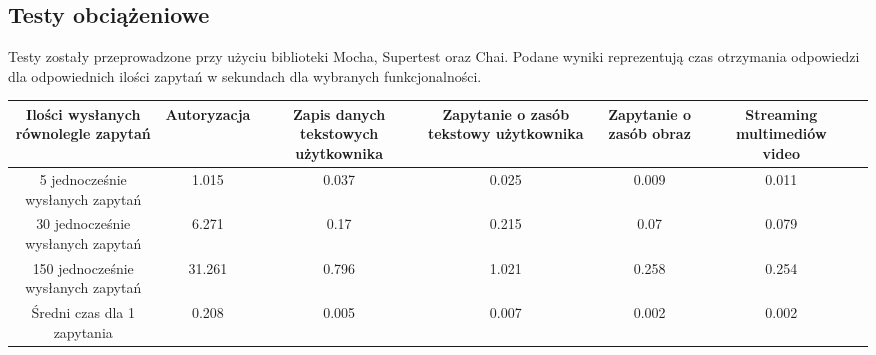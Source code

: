 \documentclass[12pt]{report}
\begin{document}
    \subsection{Testy obciążeniowe}
      Testy zostały przeprowadzone przy użyciu biblioteki Mocha, Supertest oraz Chai.
      Podane wyniki reprezentują czas otrzymania odpowiedzi dla odpowiednich ilości zapytań w sekundach dla wybranych funkcjonalności.
      \newline
      \newline
      \newline
      \newline
      \newline
      \newline
      \newline
      \newline
      \newline
      \newline
      \newline
      \begingroup
        \renewcommand{\arraystretch}{3.5}
        \begin{adjustbox}{center}
          \begin{tabular}{|c|c|c|c|c|c|p{2.6cm}}
            \hline
            \parbox{2.6cm}{Ilości wysłanych równolegle zapytań} & 
            \parbox{2.6cm}{Autoryzacja} & 
            \parbox{2.6cm}{Zapis danych tekstowych użytkownika} & 
            \parbox{2.6cm}{Zapytanie o zasób tekstowy użytkownika} & 
            \parbox{2.6cm}{Zapytanie o zasób obraz} & 
            \parbox{2.6cm}{Streaming multimediów video} \\
            \hline
            \parbox{2.6cm}{5 jednocześnie wysłanych zapytań} & 1.015 & 0.037 & 0.025 & 0.009 & 0.011 \\
            \hline
            \parbox{2.6cm}{30 jednocześnie wysłanych zapytań} & 6.271 & 0.17 & 0.215 & 0.07 & 0.079 \\
            \hline
            \parbox{2.6cm}{150 jednocześnie wysłanych zapytań} & 31.261 & 0.796 & 1.021 & 0.258 & 0.254 \\
            \hline
            \parbox{2.6cm}{Średni czas dla 1 zapytania} & 0.208 & 0.005 & 0.007 & 0.002 & 0.002 \\
            \hline
          \end{tabular}
        \end{adjustbox}
      \endgroup
      \newline
      \newline
      \newline
      \newline
      \newline
      \newline
      \newline
      \newline
      \newline
      \newline
\end{document}
